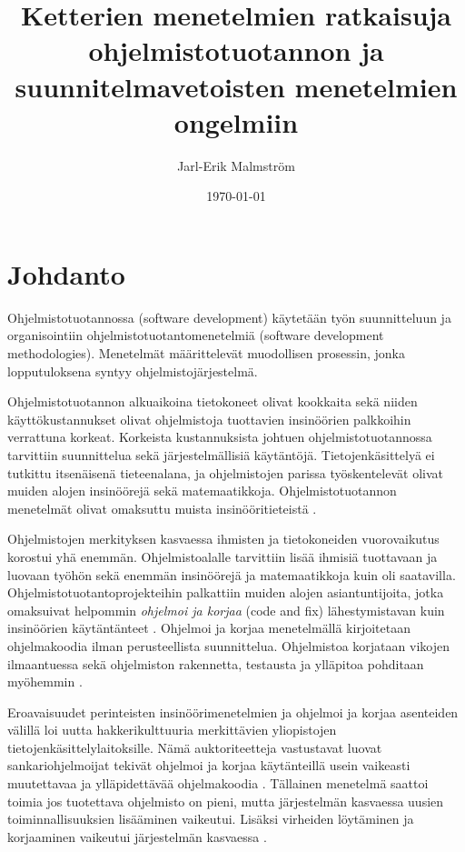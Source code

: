 \documentclass[finnish]{tktltiki2}
\title{Ketterien menetelmien ratkaisuja ohjelmistotuotannon ja suunnitelmavetoisten menetelmien ongelmiin}
\author{Jarl-Erik Malmström}
\date{\today}
\theoremstyle{definition}
\theoremstyle{remark}
\begin{document}
\pagestyle{empty}
\maketitle        %
\makeabstract     %

\tableofcontents  %
\newpage          %



\pagestyle{plain}
\setcounter{page}{1}
\section{Johdanto}

Ohjelmistotuotannossa (software development) käytetään työn suunnitteluun ja organisointiin ohjelmistotuotantomenetelmiä (software development methodologies). Menetelmät määrittelevät muodollisen prosessin, jonka lopputuloksena syntyy ohjelmistojärjestelmä.

Ohjelmistotuotannon alkuaikoina tietokoneet olivat kookkaita sekä niiden käyttö\-kustannukset olivat ohjelmistoja tuottavien insinöörien palkkoihin verrattuna korkeat. Korkeista kustannuksista johtuen ohjelmistotuotannossa tarvittiin suunnittelua sekä järjestelmällisiä käytäntöjä. Tietojen\-käsittelyä ei tutkittu itsenäisenä tieteenalana, ja ohjelmistojen parissa työsken\-televät olivat muiden alojen insinöörejä sekä matemaatikkoja. Ohjelmistotuotannon menetelmät olivat omaksuttu muista insinööritieteistä \cite{BOE06}.

Ohjelmistojen merkityksen kasvaessa ihmisten ja tietokoneiden vuorovaikutus korostui yhä enemmän. Ohjelmistoalalle tarvittiin lisää ihmisiä tuottavaan ja luovaan työhön sekä enemmän insinöörejä ja matemaatikkoja kuin oli saatavilla. Ohjelmistotuotantoprojekteihin palkattiin muiden alojen asiantuntijoita, jotka omaksuivat helpommin \textit{ohjelmoi ja korjaa} (code and fix) lähestymistavan kuin insinöörien käytäntänteet \cite{BOE06}. Ohjelmoi ja korjaa menetelmällä kirjoitetaan ohjelmakoodia ilman perusteellista suunnittelua. Ohjelmistoa korjataan vikojen ilmaantuessa sekä ohjelmiston rakennetta, testausta ja ylläpitoa pohditaan myöhemmin \cite{BOE88}.

Eroavaisuudet perinteisten insinöörimenetelmien ja ohjelmoi ja korjaa asenteiden välillä loi uutta hakkerikulttuuria merkittävien yliopistojen tietojenkäsittelylaitoksille. Nämä auktoriteetteja vastustavat luovat sankariohjelmoijat tekivät ohjelmoi ja korjaa käytänteillä usein vaikeasti muutettavaa ja ylläpidettävää ohjelmakoodia \cite{BOE06}. Tällainen menetelmä saattoi toimia jos tuotettava ohjelmisto on pieni, mutta järjestelmän kasvaessa uusien toiminnallisuuksien lisääminen vaikeutui. Lisäksi virheiden löytäminen ja korjaaminen vaikeutui järjestelmän kasvaessa \cite{FOW01a}.
\end{document}
